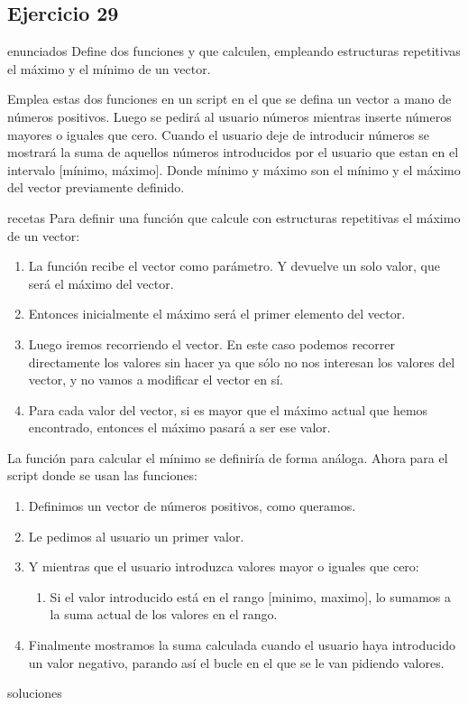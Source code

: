 \subsection{Ejercicio 29}
\def\parte{enunciados}
\ifx\capitulo\parte
Define dos funciones  y  que calculen, empleando estructuras repetitivas el máximo y el mínimo de un vector.

Emplea estas dos funciones en un script en el que se defina un vector a mano de números positivos. Luego se pedirá al usuario números mientras inserte números mayores o iguales que cero. Cuando el usuario deje de introducir números se mostrará la suma de aquellos números introducidos por el usuario que estan en el intervalo [mínimo, máximo]. Donde mínimo y máximo son el mínimo y el máximo del vector previamente definido.
\fi

\def\parte{recetas}
\ifx\capitulo\parte
Para definir una función que calcule con estructuras repetitivas el máximo de un vector:
\begin{enumerate}
\item La función recibe el vector como parámetro. Y devuelve un solo valor, que será el máximo del vector.
\item Entonces inicialmente el máximo será el primer elemento del vector.
\item Luego iremos recorriendo el vector. En este caso podemos recorrer directamente los valores sin hacer  ya que sólo no nos interesan los valores del vector, y no vamos a modificar el vector en sí.
\item Para cada valor del vector, si es mayor que el máximo actual que hemos encontrado, entonces el máximo pasará a ser ese valor.
\end{enumerate}
La función para calcular el mínimo se definiría de forma análoga. Ahora para el script donde se usan las funciones:
\begin{enumerate}
\item Definimos un vector de números positivos, como queramos.
\item Le pedimos al usuario un primer valor.
\item Y mientras que el usuario introduzca valores mayor o iguales que cero:
  \begin{enumerate}
  \item Si el valor introducido está en el rango [minimo, maximo], lo sumamos a la suma actual de los valores en el rango.
  \end{enumerate}
\item Finalmente mostramos la suma calculada cuando el usuario haya introducido un valor negativo, parando así el bucle en el que se le van pidiendo valores.
\end{enumerate}
\fi

\def\parte{soluciones}
\ifx\capitulo\parte



\fi
